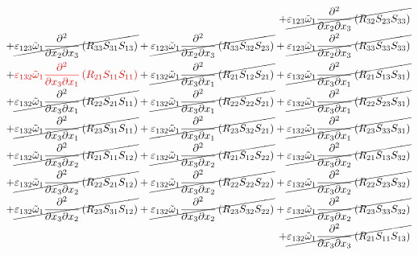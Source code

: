 \begin{equation}
\begin{split}
		+\cancel{\varepsilon_{123}\tilde{\omega}_{1}\pdv{}{x_{2}}{x_{3}}\left(R_{32}S_{23}S_{33}\right)}\\
		+\cancel{\varepsilon_{123}\tilde{\omega}_{1}\pdv{}{x_{2}}{x_{3}}\left(R_{33}S_{31}S_{13}\right)}
		+\cancel{\varepsilon_{123}\tilde{\omega}_{1}\pdv{}{x_{2}}{x_{3}}\left(R_{33}S_{32}S_{23}\right)}
		+\cancel{\varepsilon_{123}\tilde{\omega}_{1}\pdv{}{x_{2}}{x_{3}}\left(R_{33}S_{33}S_{33}\right)}\\
		+{\color{red}\varepsilon_{132}\tilde{\omega}_{1}\pdv{}{x_{3}}{x_{1}}\left(R_{21}S_{11}S_{11}\right)}
		+\cancel{\varepsilon_{132}\tilde{\omega}_{1}\pdv{}{x_{3}}{x_{1}}\left(R_{21}S_{12}S_{21}\right)}
		+\cancel{\varepsilon_{132}\tilde{\omega}_{1}\pdv{}{x_{3}}{x_{1}}\left(R_{21}S_{13}S_{31}\right)}\\
		+\cancel{\varepsilon_{132}\tilde{\omega}_{1}\pdv{}{x_{3}}{x_{1}}\left(R_{22}S_{21}S_{11}\right)}
		+\cancel{\varepsilon_{132}\tilde{\omega}_{1}\pdv{}{x_{3}}{x_{1}}\left(R_{22}S_{22}S_{21}\right)}
		+\cancel{\varepsilon_{132}\tilde{\omega}_{1}\pdv{}{x_{3}}{x_{1}}\left(R_{22}S_{23}S_{31}\right)}\\
		+\cancel{\varepsilon_{132}\tilde{\omega}_{1}\pdv{}{x_{3}}{x_{1}}\left(R_{23}S_{31}S_{11}\right)}
		+\cancel{\varepsilon_{132}\tilde{\omega}_{1}\pdv{}{x_{3}}{x_{1}}\left(R_{23}S_{32}S_{21}\right)}
		+\cancel{\varepsilon_{132}\tilde{\omega}_{1}\pdv{}{x_{3}}{x_{1}}\left(R_{23}S_{33}S_{31}\right)}\\
		+\cancel{\varepsilon_{132}\tilde{\omega}_{1}\pdv{}{x_{3}}{x_{2}}\left(R_{21}S_{11}S_{12}\right)}
		+\cancel{\varepsilon_{132}\tilde{\omega}_{1}\pdv{}{x_{3}}{x_{2}}\left(R_{21}S_{12}S_{22}\right)}
		+\cancel{\varepsilon_{132}\tilde{\omega}_{1}\pdv{}{x_{3}}{x_{2}}\left(R_{21}S_{13}S_{32}\right)}\\
		+\cancel{\varepsilon_{132}\tilde{\omega}_{1}\pdv{}{x_{3}}{x_{2}}\left(R_{22}S_{21}S_{12}\right)}
		+\cancel{\varepsilon_{132}\tilde{\omega}_{1}\pdv{}{x_{3}}{x_{2}}\left(R_{22}S_{22}S_{22}\right)}
		+\cancel{\varepsilon_{132}\tilde{\omega}_{1}\pdv{}{x_{3}}{x_{2}}\left(R_{22}S_{23}S_{32}\right)}\\
		+\cancel{\varepsilon_{132}\tilde{\omega}_{1}\pdv{}{x_{3}}{x_{2}}\left(R_{23}S_{31}S_{12}\right)}
		+\cancel{\varepsilon_{132}\tilde{\omega}_{1}\pdv{}{x_{3}}{x_{2}}\left(R_{23}S_{32}S_{22}\right)}
		+\cancel{\varepsilon_{132}\tilde{\omega}_{1}\pdv{}{x_{3}}{x_{2}}\left(R_{23}S_{33}S_{32}\right)}\\
		+\cancel{\varepsilon_{132}\tilde{\omega}_{1}\pdv{}{x_{3}}{x_{3}}\left(R_{21}S_{11}S_{13}\right)}

\end{split}
\end{equation}
